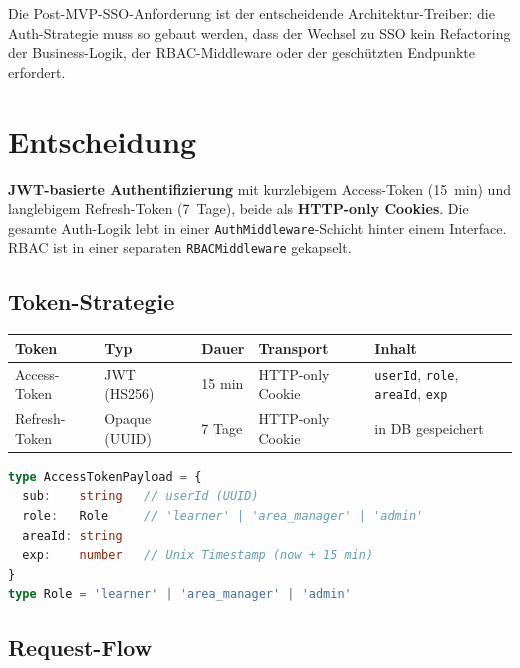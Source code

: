 \documentclass[a4paper, 11pt, oneside]{report}
\newcommand{\code}[1]{\texttt{\small #1}}
\begin{document}
Die Post-MVP-SSO-Anforderung ist der entscheidende Architektur-Treiber: die
Auth-Strategie muss so gebaut werden, dass der Wechsel zu SSO kein Refactoring
der Business-Logik, der RBAC-Middleware oder der geschützten Endpunkte erfordert.

\section{Entscheidung}

\textbf{JWT-basierte Authentifizierung} mit kurzlebigem Access-Token (15~min)
und langlebigem Refresh-Token (7~Tage), beide als \textbf{HTTP-only Cookies}.
Die gesamte Auth-Logik lebt in einer \code{AuthMiddleware}-Schicht hinter einem
Interface. RBAC ist in einer separaten \code{RBACMiddleware} gekapselt.

\subsection{Token-Strategie}

\begin{table}[htb]
\small\centering
\begin{tabular}{@{}L{2.8cm} L{2.5cm} L{2cm} L{3cm} L{3.5cm}@{}}
\toprule
{}
\textbf{Token} & \textbf{Typ} & \textbf{Dauer} & \textbf{Transport} & \textbf{Inhalt} \\
\midrule
Access-Token  & JWT (HS256) & 15 min  & HTTP-only Cookie & \code{userId}, \code{role}, \code{areaId}, \code{exp} \\
Refresh-Token & Opaque (UUID) & 7 Tage & HTTP-only Cookie & in DB gespeichert \\
\bottomrule
\end{tabular}
\end{table}

\begin{lstlisting}[language=TypeScript]
type AccessTokenPayload = {
  sub:    string   // userId (UUID)
  role:   Role     // 'learner' | 'area_manager' | 'admin'
  areaId: string
  exp:    number   // Unix Timestamp (now + 15 min)
}
type Role = 'learner' | 'area_manager' | 'admin'
\end{lstlisting}

\subsection{Request-Flow}
\end{document}
